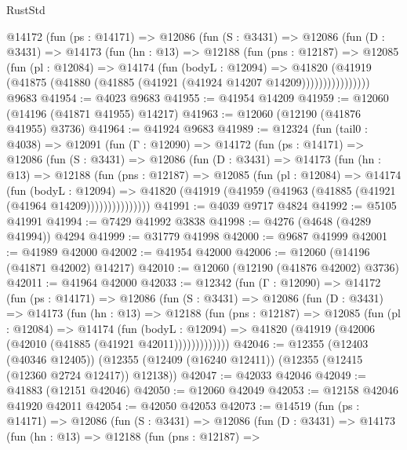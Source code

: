 \begin{lexlean}{RustStd}
\begin{coremodule}
        @14172
          (fun (ps : @14171) =>
          @12086
            (fun (S : @3431) =>
            @12086
              (fun (D : @3431) =>
              @14173
                (fun (hn : @13) =>
                @12188
                  (fun (pns : @12187) =>
                  @12085
                    (fun (pl : @12084) =>
                    @14174
                      (fun (bodyL : @12094) =>
                      @41820
                        (@41919
                          (@41875 (@41880 (@41885 (@41921 (@41924 @14207 @14209))))))))))))))))
    @9683
@41954 := @4023 @9683
@41955 := @41954 @14209
@41959 := @12060 (@14196 (@41871 @41955) @14217)
@41963 := @12060 (@12190 (@41876 @41955) @3736)
@41964 := @41924 @9683
@41989 := @12324
    (fun (tail0 : @4038) =>
    @12091
      (fun (Γ : @12090) =>
      @14172
        (fun (ps : @14171) =>
        @12086
          (fun (S : @3431) =>
          @12086
            (fun (D : @3431) =>
            @14173
              (fun (hn : @13) =>
              @12188
                (fun (pns : @12187) =>
                @12085
                  (fun (pl : @12084) =>
                  @14174
                    (fun (bodyL : @12094) =>
                    @41820 (@41919 (@41959 (@41963 (@41885 (@41921 (@41964 @14209)))))))))))))))
@41991 := @4039 @9717 @4824
@41992 := @5105 @41991
@41994 := @7429 @41992 @3838
@41998 := @4276 (@4648 (@4289 @41994)) @4294
@41999 := @31779 @41998
@42000 := @9687 @41999
@42001 := @41989 @42000
@42002 := @41954 @42000
@42006 := @12060 (@14196 (@41871 @42002) @14217)
@42010 := @12060 (@12190 (@41876 @42002) @3736)
@42011 := @41964 @42000
@42033 := @12342
    (fun (Γ : @12090) =>
    @14172
      (fun (ps : @14171) =>
      @12086
        (fun (S : @3431) =>
        @12086
          (fun (D : @3431) =>
          @14173
            (fun (hn : @13) =>
            @12188
              (fun (pns : @12187) =>
              @12085
                (fun (pl : @12084) =>
                @14174
                  (fun (bodyL : @12094) =>
                  @41820 (@41919 (@42006 (@42010 (@41885 (@41921 @42011)))))))))))))
@42046 := @12355
    (@12403 (@40346 @12405))
    (@12355 (@12409 (@16240 @12411)) (@12355 (@12415 (@12360 @2724 @12417)) @12138))
@42047 := @42033 @42046
@42049 := @41883 (@12151 @42046)
@42050 := @12060 @42049
@42053 := @12158 @42046 @41920 @42011
@42054 := @42050 @42053
@42073 := @14519
    (fun (ps : @14171) =>
    @12086
      (fun (S : @3431) =>
      @12086
        (fun (D : @3431) =>
        @14173
          (fun (hn : @13) =>
          @12188
            (fun (pns : @12187) =>

\end{coremodule}
\end{lexlean}
